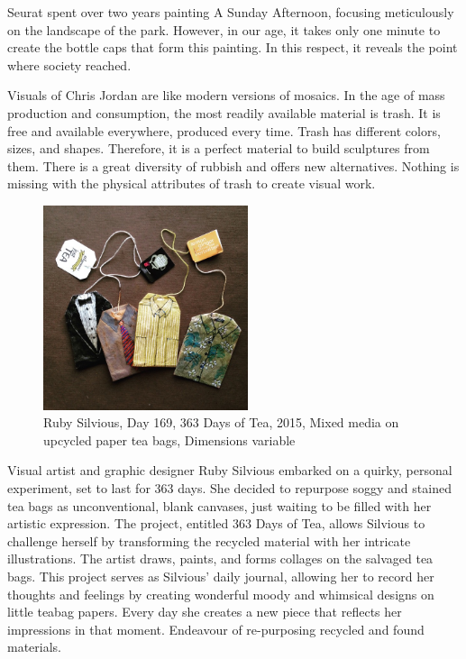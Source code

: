 Seurat spent over two years painting A Sunday Afternoon, focusing meticulously on the landscape of the park. However, in our age, it takes only one minute to create the bottle caps that form this painting. In this respect, it reveals the point where society reached.

Visuals of Chris Jordan are like modern versions of mosaics. In the age of mass production and consumption, the most readily available material is trash. It is free and available everywhere, produced every time. Trash has different colors, sizes, and shapes. Therefore, it is a perfect material to build sculptures from them. There is a great diversity of rubbish and offers new alternatives. Nothing is missing with the physical attributes of trash to create visual work.


\begin{figure}[h!]
  \centering
  \includegraphics[height=6cm]{graphics/rubysilvious-teabag-Day169.jpg}
  \caption{Ruby Silvious, Day 169, 363 Days of Tea, 2015, Mixed media on upcycled paper tea bags, Dimensions variable}
  \label{fig:RubySilvious_TeaBag}
\end{figure}
  
Visual artist and graphic designer Ruby Silvious embarked on a quirky, personal experiment, set to last for 363 days. She decided to repurpose soggy and stained tea bags as unconventional, blank canvases, just waiting to be filled with her artistic expression. The project, entitled 363 Days of Tea, allows Silvious to challenge herself by transforming the recycled material with her intricate illustrations. The artist draws, paints, and forms collages on the salvaged tea bags. This project serves as Silvious’ daily journal, allowing her to record her thoughts and feelings by creating wonderful moody and whimsical designs on little teabag papers. Every day she creates a new piece that reflects her impressions in that moment. Endeavour of re-purposing recycled and found materials. 

